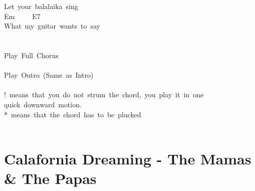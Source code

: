 \documentclass[]{book}
\let\stdsection\section
\renewcommand\section{\clearpage\stdsection}
\begin{document}
Let~your~balalaika~sing\\
\hspace*{0.333em}\hspace*{0.333em}\hspace*{0.333em}\hspace*{0.333em}\hspace*{0.333em}\hspace*{0.333em}\hspace*{0.333em}\hspace*{0.333em}\hspace*{0.333em}\hspace*{0.333em}\hspace*{0.333em}\hspace*{0.333em}\hspace*{0.333em}\hspace*{0.333em}\hspace*{0.333em}\hspace*{0.333em}\hspace*{0.333em}\hspace*{0.333em}\hspace*{0.333em}\hspace*{0.333em}\hspace*{0.333em}\hspace*{0.333em}\hspace*{0.333em}\hspace*{0.333em}Em~~~~~E7\\
What~my~guitar~wants~to~say\\
~\\
~\\
Play~Full~Chorus\\
~\\
Play~Outro~(Same~as~Intro)\\
~\\
!~means~that~you~do~not~strum~the~chord,~you~play~it~in~one~\\
\hspace*{0.333em}\hspace*{0.333em}quick~downward~motion.\\
*~means~that~the~chord~has~to~be~plucked\\
~\\

\hypertarget{calafornia-dreaming---the-mamas-the-papas}{%
\section{Calafornia Dreaming - The Mamas \& The Papas}\label{calafornia-dreaming---the-mamas-the-papas}}
\end{document}
